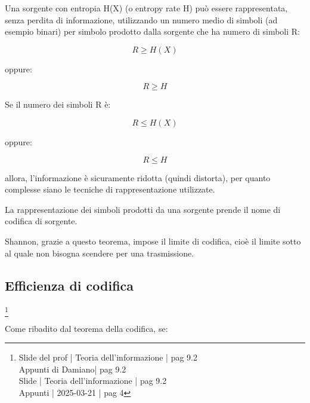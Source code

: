 \begin{tcolorbox}[colback=yellow!5!white,colframe=black!75!black]
Una sorgente con entropia H(X) (o entropy rate H) può essere rappresentata, senza perdita di informazione, 
utilizzando un numero medio di simboli (ad esempio binari) per simbolo prodotto dalla sorgente che ha numero di simboli R:

{
    \Large 
    \begin{equation}
        R \ge H(X)
    \end{equation}
}

oppure: 

{
    \Large 
    \begin{equation}
        R \ge H
    \end{equation}
}

Se il numero dei simboli R è: 

{
    \Large 
    \begin{equation}
        R \le H(X)
    \end{equation}
}

oppure: 

{
    \Large 
    \begin{equation}
        R \le H
    \end{equation}
}

allora, l'informazione è sicuramente ridotta (quindi distorta), 
per quanto complesse siano le tecniche di rappresentazione utilizzate. 
\end{tcolorbox}

La rappresentazione dei simboli prodotti da una sorgente prende il nome di codifica di sorgente. \newline 

Shannon, grazie a questo teorema, impose il limite di codifica, cioè il limite sotto al quale non bisogna scendere per una trasmissione. \newline 

\newpage 

\subsection{Efficienza di codifica}
\footnote{Slide del prof | Teoria dell'informazione | pag 9.2 \\  
Appunti di Damiano| pag 9.2 \\
Slide | Teoria dell'informazione | pag 9.2 \\
Appunti | 2025-03-21 | pag 4
}

Come ribadito dal teorema della codifica, se: 

